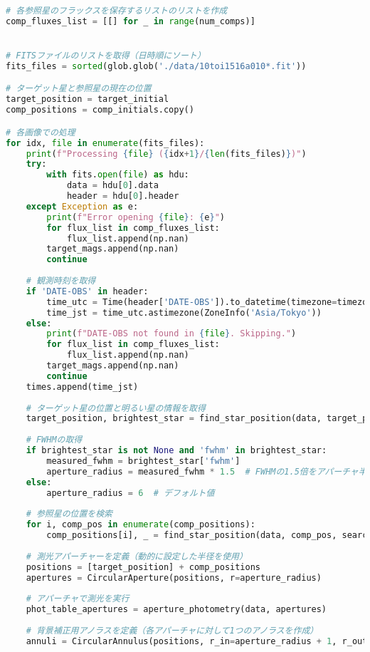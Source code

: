 \begin{lstlisting}[caption=開口測光用のコード, label=apphot, language=Python]
# 各参照星のフラックスを保存するリストのリストを作成
comp_fluxes_list = [[] for _ in range(num_comps)]


# FITSファイルのリストを取得（日時順にソート）
fits_files = sorted(glob.glob('./data/10toi1516a010*.fit'))

# ターゲット星と参照星の現在の位置
target_position = target_initial
comp_positions = comp_initials.copy()

# 各画像での処理
for idx, file in enumerate(fits_files):
    print(f"Processing {file} ({idx+1}/{len(fits_files)})")
    try:
        with fits.open(file) as hdu:
            data = hdu[0].data
            header = hdu[0].header
    except Exception as e:
        print(f"Error opening {file}: {e}")
        for flux_list in comp_fluxes_list:
            flux_list.append(np.nan)
        target_mags.append(np.nan)
        continue
    
    # 観測時刻を取得
    if 'DATE-OBS' in header:
        time_utc = Time(header['DATE-OBS']).to_datetime(timezone=timezone.utc)
        time_jst = time_utc.astimezone(ZoneInfo('Asia/Tokyo'))
    else:
        print(f"DATE-OBS not found in {file}. Skipping.")
        for flux_list in comp_fluxes_list:
            flux_list.append(np.nan)
        target_mags.append(np.nan)
        continue
    times.append(time_jst)
    
    # ターゲット星の位置と明るい星の情報を取得
    target_position, brightest_star = find_star_position(data, target_position, search_radius=search_radius)
    
    # FWHMの取得
    if brightest_star is not None and 'fwhm' in brightest_star:
        measured_fwhm = brightest_star['fwhm']
        aperture_radius = measured_fwhm * 1.5  # FWHMの1.5倍をアパーチャ半径とする
    else:
        aperture_radius = 6  # デフォルト値
    
    # 参照星の位置を検索
    for i, comp_pos in enumerate(comp_positions):
        comp_positions[i], _ = find_star_position(data, comp_pos, search_radius=search_radius)
    
    # 測光アパーチャーを定義（動的に設定した半径を使用）
    positions = [target_position] + comp_positions
    apertures = CircularAperture(positions, r=aperture_radius)
    
    # アパーチャで測光を実行
    phot_table_apertures = aperture_photometry(data, apertures)
    
    # 背景補正用アノラスを定義（各アパーチャに対して1つのアノラスを作成）
    annuli = CircularAnnulus(positions, r_in=aperture_radius + 1, r_out=aperture_radius + 4)
    

\end{lstlisting}
